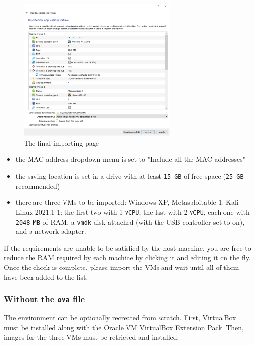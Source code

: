 \begin{figure}[htbp]
	\centering
	\includegraphics[width=0.7\textwidth]{../drawable/decorations/importing-screen.png}
    \caption{The final importing page}
    \label{fig:getting-started:import-screen}
\end{figure}

\begin{itemize}
    \item the MAC address dropdown menu is set to "Include all the MAC addresses"
    \item the saving location is set in a drive with at least \texttt{15 GB} of free space (\texttt{25 GB} recommended)
    \item there are three VMs to be imported: Windows XP, Metasploitable 1, Kali Linux-2021.1 1: the first two with 1 \texttt{vCPU}, the last with 2 \texttt{vCPU}, each one with \texttt{2048 MB} of RAM, a \texttt{vmdk} disk attached (with the USB controller set to on), and a network adapter.
\end{itemize}

If the requirements are unable to be satisfied by the host machine, you are free to reduce the RAM required by each machine by clicking it and editing it on the fly. Once the check is complete, please import the VMs and wait until all of them have been added to the list.

\subsubsection{Without the \texttt{ova} file}
\label{subsubsec:getting-started:without-ova}

The environment can be optionally recreated from scratch. First, VirtualBox must be installed along with the Oracle VM VirtualBox Extension Pack. Then, images for the three VMs must be retrieved and installed:

